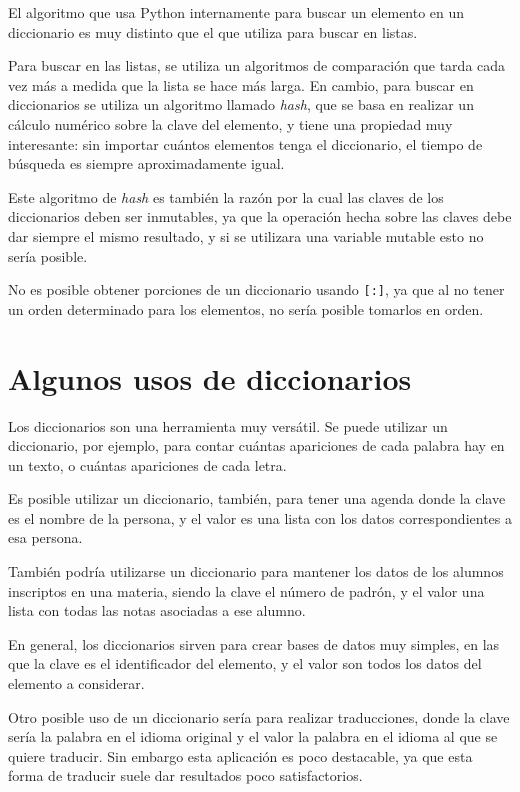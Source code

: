 \begin{sabias_que}
El algoritmo que usa Python internamente para buscar un elemento en un
diccionario es muy distinto que el que utiliza para buscar en listas.

Para buscar en las listas, se utiliza un algoritmos de comparación que
tarda cada vez más a medida que la lista se hace más larga.  En cambio,
para buscar en diccionarios se utiliza un algoritmo llamado \emph{hash},
que se basa en realizar un cálculo numérico sobre la clave del elemento,
y tiene una propiedad muy interesante: sin importar cuántos elementos
tenga el diccionario, el tiempo de búsqueda es siempre aproximadamente
igual.

Este algoritmo de \emph{hash} es también la razón por la cual las claves de
los diccionarios deben ser inmutables, ya que la operación hecha sobre las
claves debe dar siempre el mismo resultado, y si se utilizara una variable
mutable esto no sería posible.
\end{sabias_que}

No es posible obtener porciones de un diccionario usando \lstinline![:]!,
ya que al no tener un orden determinado para los elementos, no sería
posible tomarlos en orden.

\section{Algunos usos de diccionarios}

Los diccionarios son una herramienta muy versátil.  Se puede utilizar un
diccionario, por ejemplo, para contar cuántas apariciones de cada palabra
hay en un texto, o cuántas apariciones de cada letra.

Es posible utilizar un diccionario, también, para tener una agenda donde la
clave es el nombre de la persona, y el valor es una lista con los datos
correspondientes a esa persona.

También podría utilizarse un diccionario para mantener los datos de los
alumnos inscriptos en una materia, siendo la clave el número de padrón, y
el valor una lista con todas las notas asociadas a ese alumno.

En general, los diccionarios sirven para crear bases de datos muy simples,
en las que la clave es el identificador del elemento, y el valor son todos
los datos del elemento a considerar.

Otro posible uso de un diccionario sería para realizar
traducciones, donde la clave sería la palabra en el idioma original y el
valor la palabra en el idioma al que se quiere traducir.  Sin embargo esta
aplicación es poco destacable, ya que esta forma de traducir suele dar
resultados poco satisfactorios.

